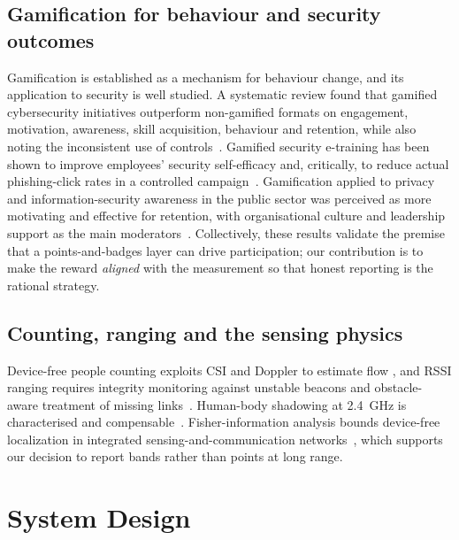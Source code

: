 \documentclass[journal,10pt]{IEEEtran}
\begin{document}
\subsection{Gamification for behaviour and security outcomes}
Gamification is established as a mechanism for behaviour change, and its
application to security is well studied. A systematic review found that
gamified cybersecurity initiatives outperform non-gamified formats on
engagement, motivation, awareness, skill acquisition, behaviour and retention,
while also noting the inconsistent use of controls~\cite{gwenhure2025}.
Gamified security e-training has been shown to improve employees' security
self-efficacy and, critically, to reduce actual phishing-click rates in a
controlled campaign~\cite{horst2024gamify}. Gamification applied to privacy and
information-security awareness in the public sector was perceived as more
motivating and effective for retention, with organisational culture and
leadership support as the main moderators~\cite{cm2026gamify}. Collectively,
these results validate the premise that a points-and-badges layer can drive
participation; our contribution is to make the reward \emph{aligned} with the
measurement so that honest reporting is the rational strategy.

\subsection{Counting, ranging and the sensing physics}
Device-free people counting exploits CSI and Doppler to estimate flow
\cite{khan2023,zhou2020,dmip2023}, and RSSI ranging requires integrity
monitoring against unstable beacons and obstacle-aware treatment of missing
links~\cite{ramirez2021,milano2024,bai2020}. Human-body shadowing at 2.4~GHz is
characterised and compensable~\cite{januszkiewicz2018}. Fisher-information
analysis bounds device-free localization in integrated sensing-and-communication
networks~\cite{li2024}, which supports our decision to report bands rather than
points at long range.

\section{System Design}
\end{document}
